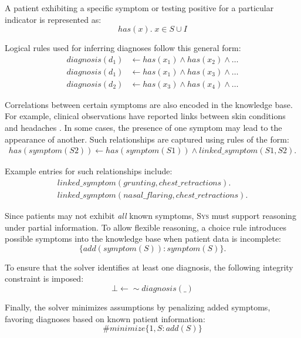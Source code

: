\documentclass[10pt,leqno]{amsart}
\newcommand{\sys}{\textsc{Sys}\xspace}
\begin{document}
A patient exhibiting a specific symptom or testing positive for a particular indicator is represented as:
\begin{equation}
    has(x). \; x \in S \cup I
\end{equation}

Logical rules used for inferring diagnoses follow this general form:
\begin{align}
    diagnosis(d_1) & \longleftarrow has(x_1) \land has(x_2) \land \dots \\
    diagnosis(d_1) & \longleftarrow has(x_1) \land has(x_3) \land \dots \\
    diagnosis(d_2) & \longleftarrow has(x_3) \land has(x_4) \land \dots
\end{align}

Correlations between certain symptoms are also encoded in the knowledge base. 
For example, clinical observations have reported links between skin conditions and headaches \cite{migraine-hives}. 
In some cases, the presence of one symptom may lead to the appearance of another. 
Such relationships are captured using rules of the form:
\begin{align}
    has(symptom(S2)) \longleftarrow has(symptom(S1)) \land linked\_symptom(S1, S2).
\end{align}

Example entries for such relationships include:
\begin{align}
    linked\_symptom(grunting, chest\_retractions).\\
    linked\_symptom(nasal\_flaring, chest\_retractions).
\end{align}

Since patients may not exhibit \textit{all} known symptoms, 
\sys must support reasoning under partial information. 
To allow flexible reasoning, a choice rule introduces possible symptoms 
into the knowledge base when patient data is incomplete:
\begin{equation}
    \{ add(symptom(S)) : symptom(S) \}.
\end{equation}

To ensure that the solver identifies at least one diagnosis, 
the following integrity constraint is imposed:
\begin{equation}
    \bot \longleftarrow \sim diagnosis(\_)
\end{equation}

Finally, the solver minimizes assumptions by penalizing added symptoms, 
favoring diagnoses based on known patient information:
\begin{equation}
    \#minimize \{ 1, S : add(S) \}
\end{equation}
\end{document}
